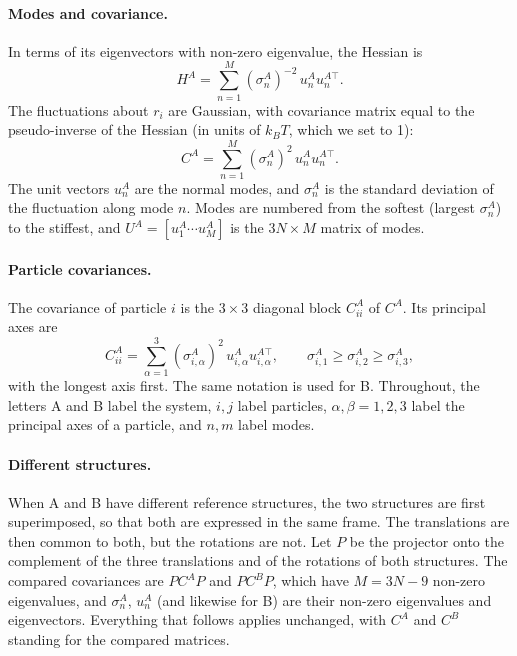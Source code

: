 \documentclass[11pt,a4paper]{article}
\begin{document}
\paragraph{Modes and covariance.} In terms of its eigenvectors with non-zero eigenvalue, the Hessian is
\begin{equation}
H^A = \sum_{n=1}^{M} (\sigma^A_n)^{-2}\, u^A_n u^{A\top}_n .
\end{equation}
The fluctuations about $r_i$ are Gaussian, with covariance matrix equal to the pseudo-inverse of the Hessian (in units of $k_BT$, which we set to 1):
\begin{equation}
C^A = \sum_{n=1}^{M} (\sigma^A_n)^2\, u^A_n u^{A\top}_n .
\end{equation}
The unit vectors $u^A_n$ are the normal modes, and $\sigma^A_n$ is the standard deviation of the fluctuation along mode $n$. Modes are numbered from the softest (largest $\sigma^A_n$) to the stiffest, and $U^A = [u^A_1\cdots u^A_M]$ is the $3N\times M$ matrix of modes.

\paragraph{Particle covariances.} The covariance of particle $i$ is the $3\times3$ diagonal block $C^A_{ii}$ of $C^A$. Its principal axes are
\begin{equation}
C^A_{ii} = \sum_{\alpha=1}^{3} (\sigma^A_{i,\alpha})^2\, u^A_{i,\alpha} u^{A\top}_{i,\alpha}, \qquad \sigma^A_{i,1}\ge\sigma^A_{i,2}\ge\sigma^A_{i,3},
\end{equation}
with the longest axis first. The same notation is used for B. Throughout, the letters A and B label the system, $i, j$ label particles, $\alpha,\beta = 1,2,3$ label the principal axes of a particle, and $n, m$ label modes.

\paragraph{Different structures.} When A and B have different reference structures, the two structures are first superimposed, so that both are expressed in the same frame. The translations are then common to both, but the rotations are not. Let $P$ be the projector onto the complement of the three translations and of the rotations of both structures. The compared covariances are $PC^AP$ and $PC^BP$, which have $M = 3N - 9$ non-zero eigenvalues, and $\sigma^A_n$, $u^A_n$ (and likewise for B) are their non-zero eigenvalues and eigenvectors. Everything that follows applies unchanged, with $C^A$ and $C^B$ standing for the compared matrices.
\end{document}
